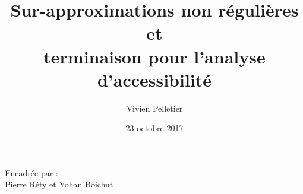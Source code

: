 \author{
  Vivien Pelletier
}
\title[Soutenance de thèse]{Sur-approximations non régulières et\\ terminaison pour l'analyse d'accessibilité}
\date{23 octobre 2017}
\institute
{
  \footnotesize{Encadrée par :}\\
  Pierre Réty et Yohan Boichut
}
